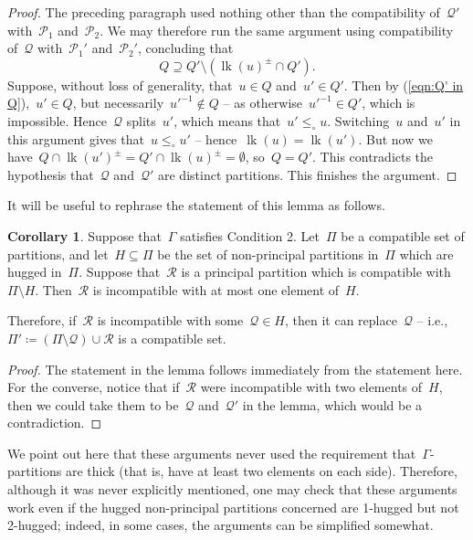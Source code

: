 \documentclass[11pt]{amsart}
\theoremstyle{definition}
\theoremstyle{definition}
\theoremstyle{definition}
\theoremstyle{definition}
\newtheorem{corollary}[theorem]{Corollary}
\newcommand{\calQ}{\mathcal{Q}}
\newcommand{\calP}{\mathcal{P}} %
\newcommand{\calR}{\mathcal{R}} %
\newcommand{\link}[1]{\operatorname{lk}({#1})} %
\begin{document}
\begin{proof}
    The preceding paragraph used nothing other than the compatibility of~$\calQ'$ with~$\calP_1$ and~$\calP_2$. We may therefore run the same argument using compatibility of~$\calQ$ with~$\calP_1'$ and~$\calP_2'$, concluding that 
    \begin{equation}\label{eqn:Q' in Q}
        Q \supseteq Q' \setminus \left( \link{u}^\pm \cap Q'\right).
    \end{equation}
    Suppose, without loss of generality, that~$u \in Q$ and~$u' \in Q'$. Then by (\ref{eqn:Q' in Q}),~$u' \in Q$, but necessarily~$u'^{-1} \notin Q$ -- as otherwise~$u'^{-1} \in Q'$, which is impossible. Hence~$\calQ$ splits~$u'$, which means that~$u' \leq_\circ u$. Switching~$u$ and~$u'$ in this argument gives that~$u \leq_\circ u'$ -- hence~$\link{u} = \link{u'}$. But now we have~$Q \cap \link{u'}^\pm = Q' \cap \link{u}^\pm = \emptyset$, so~$Q = Q'$. This contradicts the hypothesis that~$\calQ$ and~$\calQ'$ are distinct partitions. This finishes the argument.
\end{proof}

It will be useful to rephrase the statement of this lemma as follows. 
\begin{corollary}\label{cor:restatement of Key Lemma 2}
    Suppose that~$\Gamma$ satisfies Condition 2. Let~$\Pi$ be a compatible set of partitions, and let~$H \subseteq \Pi$ be the set of non-principal partitions in~$\Pi$ which are hugged in~$\Pi$. Suppose that~$\calR$ is a principal partition which is compatible with~$\Pi \setminus H$. Then~$\calR$ is incompatible with at most one element of~$H$. 
    
    \noindent Therefore, if~$\calR$ is incompatible with some~$\calQ \in H$, then it can replace~$\calQ$ -- i.e.,~$\Pi' \coloneqq \left( \Pi \setminus \calQ \right) \cup \calR$ is a compatible set. 
\end{corollary}

\begin{proof}
    The statement in the lemma follows immediately from the statement here. For the converse, notice that if~$\calR$ were incompatible with two elements of~$H$, then we could take them to be~$\calQ$ and~$\calQ'$ in the lemma, which would be a contradiction.
\end{proof}

We point out here that these arguments never used the requirement that~$\Gamma$-partitions are thick (that is, have at least two elements on each side). Therefore, although it was never explicitly mentioned, one may check that these arguments work even if the hugged non-principal partitions concerned are 1-hugged but not 2-hugged; indeed, in some cases, the arguments can be simplified somewhat.
\end{document}
